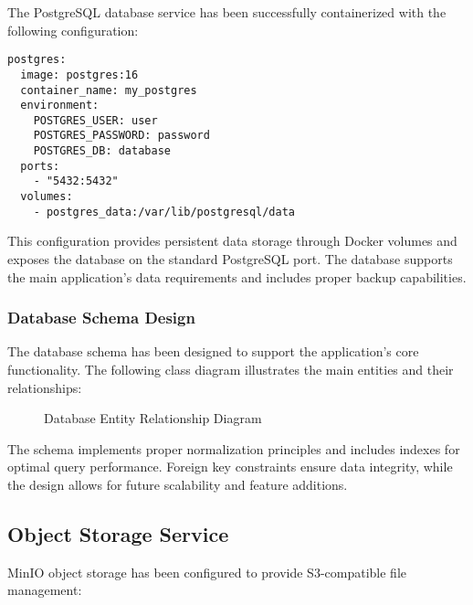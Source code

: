 The PostgreSQL database service has been successfully containerized with the following configuration:

\begin{verbatim}
postgres:
  image: postgres:16
  container_name: my_postgres
  environment:
    POSTGRES_USER: user
    POSTGRES_PASSWORD: password
    POSTGRES_DB: database
  ports:
    - "5432:5432"
  volumes:
    - postgres_data:/var/lib/postgresql/data
\end{verbatim}

This configuration provides persistent data storage through Docker volumes and exposes the database on the standard PostgreSQL port. The database supports the main application's data requirements and includes proper backup capabilities.

\subsubsection{Database Schema Design}

The database schema has been designed to support the application's core functionality. The following class diagram illustrates the main entities and their relationships:

\begin{figure}[H]
    \centering
    \caption{Database Entity Relationship Diagram}
    \label{fig:database_schema}
\end{figure}

The schema implements proper normalization principles and includes indexes for optimal query performance. Foreign key constraints ensure data integrity, while the design allows for future scalability and feature additions.

\subsection{Object Storage Service}

MinIO object storage has been configured to provide S3-compatible file management:

